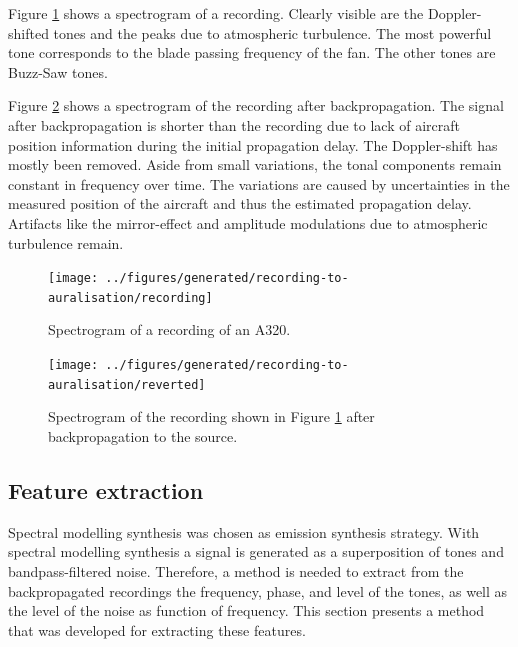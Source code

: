 Figure \ref{fig:recording} shows a spectrogram of a recording. Clearly visible
are the Doppler-shifted tones and the peaks due to atmospheric turbulence. The
most powerful tone corresponds to the blade passing frequency of the fan. The
other tones are Buzz-Saw tones.

Figure \ref{fig:backpropagated} shows a spectrogram of the recording after
backpropagation. The signal after backpropagation is shorter than the recording
due to lack of aircraft position information during the initial propagation
delay. The Doppler-shift has mostly been removed. Aside from small variations,
the tonal components remain constant in frequency over time. The variations are
caused by uncertainties in the measured position of the aircraft and thus the
estimated propagation delay. Artifacts like the mirror-effect and amplitude
modulations due to atmospheric turbulence remain.

\begin{figure}[H]
  \centering
  \texttt{[image: ../figures/generated/recording-to-auralisation/recording]}
  \caption{
    Spectrogram of a recording of an A320. }
  \label{fig:recording}
\end{figure}

\begin{figure}[H]
  \centering
  \texttt{[image: ../figures/generated/recording-to-auralisation/reverted]}
  \caption{Spectrogram of the recording shown in Figure \ref{fig:recording} after backpropagation to the source.}
  \label{fig:backpropagated}
\end{figure}

\subsection{Feature extraction}\label{sec:tool:emission:features}
Spectral modelling synthesis was chosen as emission synthesis strategy. With
spectral modelling synthesis a signal is generated as a superposition of tones
and bandpass-filtered noise.
Therefore, a method is needed to extract from the backpropagated recordings the
frequency, phase, and level of the tones, as well as the level of the noise as
function of frequency. This section presents a method that was developed for
extracting these features.

